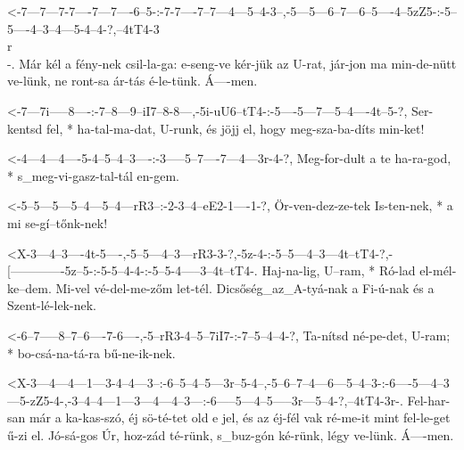   {<-7---7---7-7----7---7----6--5-:-7-7----7--7---4---5--4-3--,-5---5---6--7---6--5----4--5zZ5-:-5--5----4--3--4---5-4--4-?,--4tT4-3\\r\\-.}
  {  Már kél a fény-nek csil-la-ga: e-seng-ve kér-jük az U-rat, jár-jon ma min-de-nütt ve-lünk,  ne ront-sa ár-tás é-le-tünk. Á----men.}

  {<-7---7i-----8----:-7--8---9--iI7--8-8---,-5i-uU6--tT4-:-5----5---7---5--4----4t--5-?,}
  {  Ser-kentsd fel, * ha-tal-ma-dat, U-runk, és jöjj el,   hogy meg-sza-ba-díts min-ket!}

  {<-4---4---4----5-4--5--4--3----:-3-----5--7----7---4---3r-4-?,}
  {  Meg-for-dult a te ha-ra-god, * s_meg-vi-gasz-tal-tál en-gem.}

  {<-5--5---5---5--4---5--4---rR3--:-2-3--4--eE2-1----1-?,}
  {  Ör-ven-dez-ze-tek Is-ten-nek, * a mi se-gí--tőnk-nek!}

  {<X-3---4--3----4t-5----,-5--5---4--3---rR3-3-?,-5z-4-:-5--5---4--3---4t--tT4-?,-[-------------5z--5-:-5-5--4-4-:-5--5-4-----3--4t--tT4-.}
  {   Haj-na-lig, U--ram, * Ró-lad el-mél-ke--dem. Mi-vel vé-del-me-zőm let-tél.   Dicsőség_az_A-tyá-nak a Fi-ú-nak és a Szent-lé-lek-nek.}

  {<-6--7-----8--7--6----7-6----,-5--rR3-4--5--7iI7-:-7--5--4--4-?,}
  {  Ta-nítsd né-pe-det, U-ram; * bo-csá-na-tá-ra     bű-ne-ik-nek.}



  {<X-3---4---4---1---3-4--4---3--:-6--5--4--5---3r--5-4--,-5--6--7--4---6---5--4--3-:-6----5---4--3---5-zZ5-4-,-3--4--4---1---3---4---4--3---:-6-----5---4--5-----3r---5--4-?,--4tT4-3r-.}
  {   Fel-har-san már a ka-kas-szó, éj sö-té-tet old e jel, és az éj-fél vak ré-me-it  mint fel-le-get ű-zi  el. Jó-sá-gos Úr, hoz-zád té-rünk, s_buz-gón ké-rünk, légy ve-lünk. Á----men.}

